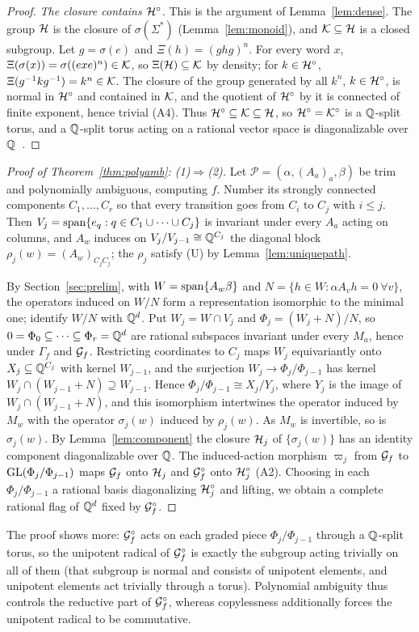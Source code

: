 \begin{proof}
\emph{The closure contains $\mathcal{H}^\circ$.} This is the argument of Lemma~\ref{lem:dense}. The group $\mathcal{H}$ is
the closure of $\sigma(\Sigma^*)$ (Lemma~\ref{lem:monoid}), and $\mathcal{K}\subseteq\mathcal{H}$ is a closed subgroup.
Let $g=\sigma(e)$ and $\Xi(h)=(ghg)^n$. For every word $x$, $\Xi(\sigma(x))=\sigma((exe)^n)\in\mathcal{K}$,
so $\Xi(\mathcal{H})\subseteq\mathcal{K}$ by density; for $k\in\mathcal{H}^\circ$, $\Xi(g^{-1}kg^{-1})=k^n\in\mathcal{K}$. The closure
of the group generated by all $k^n$, $k\in\mathcal{H}^\circ$, is normal in $\mathcal{H}^\circ$ and contained in $\mathcal{K}$,
and the quotient of $\mathcal{H}^\circ$ by it is connected of finite exponent, hence trivial (A4). Thus
$\mathcal{H}^\circ\subseteq\mathcal{K}\subseteq\mathcal{H}$, so $\mathcal{H}^\circ=\mathcal{K}^\circ$ is a $\mathbb{Q}$-split torus, and a $\mathbb{Q}$-split torus
acting on a rational vector space is diagonalizable over $\mathbb{Q}$~\cite[\S8]{Bor91}.
\end{proof}

\begin{proof}[Proof of Theorem~\ref{thm:polyamb}: (1)$\Rightarrow$(2)]
Let $\mathcal P=(\alpha,(A_a)_a,\beta)$ be trim and polynomially ambiguous, computing $f$. Number its
strongly connected components $C_1,\ldots,C_r$ so that every transition goes from $C_i$ to $C_j$ with
$i\le j$. Then $V_j=\operatorname{span}\{e_q:q\in C_1\cup\cdots\cup C_j\}$ is invariant under every $A_a$ acting on
columns, and $A_w$ induces on $V_j/V_{j-1}\cong\mathbb{Q}^{C_j}$ the diagonal block
$\rho_j(w)=(A_w)_{C_jC_j}$; the $\rho_j$ satisfy (U) by Lemma~\ref{lem:uniquepath}.

By Section~\ref{sec:prelim}, with $W=\operatorname{span}\{A_w\beta\}$ and $N=\{h\in W:\alpha A_vh=0\ \forall v\}$, the
operators induced on $W/N$ form a representation isomorphic to the minimal one; identify $W/N$ with
$\mathbb{Q}^d$. Put $W_j=W\cap V_j$ and $\Phi_j=(W_j+N)/N$, so $0=\Phi_0\subseteq\cdots\subseteq \Phi_r=\mathbb{Q}^d$ are
rational subspaces invariant under every $M_a$, hence under $\Gamma_f$ and $\mathcal{G}_f$. Restricting
coordinates to $C_j$ maps $W_j$ equivariantly onto $X_j\subseteq\mathbb{Q}^{C_j}$ with kernel $W_{j-1}$, and
the surjection $W_j\to \Phi_j/\Phi_{j-1}$ has kernel $W_j\cap(W_{j-1}+N)\supseteq W_{j-1}$. Hence
$\Phi_j/\Phi_{j-1}\cong X_j/Y_j$, where $Y_j$ is the image of $W_j\cap(W_{j-1}+N)$, and this isomorphism
intertwines the operator induced by $M_w$ with the operator $\sigma_j(w)$ induced by $\rho_j(w)$. As
$M_w$ is invertible, so is $\sigma_j(w)$. By Lemma~\ref{lem:component} the closure $\mathcal{H}_j$ of
$\{\sigma_j(w)\}$ has an identity component diagonalizable over $\mathbb{Q}$. The induced-action morphism
$\varpi_j$ from $\mathcal{G}_f$ to $\mathrm{GL}(\Phi_j/\Phi_{j-1})$ maps $\mathcal{G}_f$ onto $\mathcal{H}_j$ and $\mathcal{G}_f^\circ$ onto $\mathcal{H}_j^\circ$
(A2). Choosing in each $\Phi_j/\Phi_{j-1}$ a rational basis diagonalizing $\mathcal{H}_j^\circ$ and lifting, we obtain
a complete rational flag of $\mathbb{Q}^d$ fixed by $\mathcal{G}_f^\circ$.
\end{proof}

The proof shows more: $\mathcal{G}_f^\circ$ acts on each graded piece $\Phi_j/\Phi_{j-1}$ through a $\mathbb{Q}$-split torus,
so the unipotent radical of $\mathcal{G}_f^\circ$ is exactly the subgroup acting trivially on all of them
(that subgroup is normal and consists of unipotent elements, and unipotent elements act trivially
through a torus).
Polynomial ambiguity thus controls the reductive part of $\mathcal{G}_f^\circ$, whereas copylessness
additionally forces the unipotent radical to be commutative.
